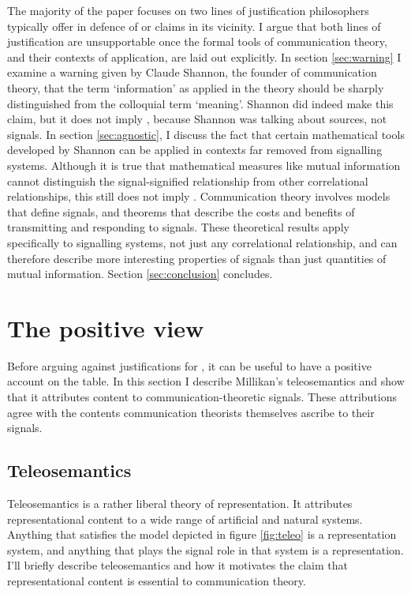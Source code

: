 \documentclass[12pt]{article}
\begin{document}
The majority of the paper focuses on two lines of justification philosophers typically offer in defence of \tic{} or claims in its vicinity.
I argue that both lines of justification are unsupportable once the formal tools of communication theory, and their contexts of application, are laid out explicitly.
In section \ref{sec:warning} I examine a warning given by Claude Shannon, the founder of communication theory, that the term `information' as applied in the theory should be sharply distinguished from the colloquial term `meaning'.
Shannon did indeed make this claim, but it does not imply \tic{}, because Shannon was talking about sources, not signals.
In section \ref{sec:agnostic}, I discuss the fact that certain mathematical tools developed by Shannon can be applied in contexts far removed from signalling systems.
Although it is true that mathematical measures like mutual information cannot distinguish the signal-signified relationship from other correlational relationships, this still does not imply \tic{}. 
Communication theory involves models that define signals, and theorems that describe the costs and benefits of transmitting and responding to signals.
These theoretical results apply specifically to signalling systems, not just any correlational relationship, and can therefore describe more interesting properties of signals than just quantities of mutual information.
Section \ref{sec:conclusion} concludes.

\section{The positive view}\label{sec:positive}

Before arguing against justifications for \tic{}, it can be useful to have a positive account on the table.
In this section I describe Millikan's teleosemantics and show that it attributes content to communication-theoretic signals.
These attributions agree with the contents communication theorists themselves ascribe to their signals.

\subsection{Teleosemantics}
Teleosemantics is a rather liberal theory of representation.
It attributes representational content to a wide range of artificial and natural systems.
Anything that satisfies the model depicted in figure \ref{fig:teleo} is a representation system, and anything that plays the signal role in that system is a representation.
I'll briefly describe teleosemantics and how it motivates the claim that representational content is essential to communication theory.
\end{document}
